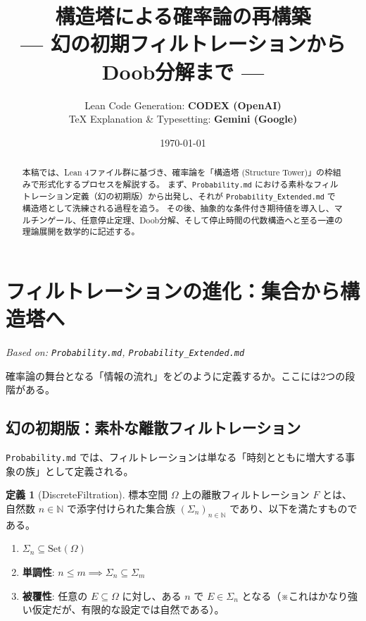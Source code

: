 \documentclass[a4paper,11pt]{ltjsarticle}
\title{\textbf{構造塔による確率論の再構築} \\ \large --- 幻の初期フィルトレーションからDoob分解まで ---}
\author{
    Lean Code Generation: \textbf{CODEX (OpenAI)} \\
    TeX Explanation \& Typesetting: \textbf{Gemini (Google)}
}
\date{\today}
\theoremstyle{definition}
\newtheorem{definition}{定義}[section]
\newcommand{\N}{\mathbb{N}}
\newcommand{\OmegaSpace}{\Omega}
\begin{document}
\maketitle

\begin{abstract}
本稿では、Lean 4ファイル群に基づき、確率論を「構造塔 (Structure Tower)」の枠組みで形式化するプロセスを解説する。
まず、\texttt{Probability.md} における素朴なフィルトレーション定義（幻の初期版）から出発し、それが \texttt{Probability\_Extended.md} で構造塔として洗練される過程を追う。
その後、抽象的な条件付き期待値を導入し、マルチンゲール、任意停止定理、Doob分解、そして停止時間の代数構造へと至る一連の理論展開を数学的に記述する。
\end{abstract}

\tableofcontents
\newpage

\section{フィルトレーションの進化：集合から構造塔へ}
\label{sec:foundations}
\textit{Based on: \texttt{Probability.md}, \texttt{Probability\_Extended.md}}

確率論の舞台となる「情報の流れ」をどのように定義するか。ここには2つの段階がある。

\subsection{幻の初期版：素朴な離散フィルトレーション}
\texttt{Probability.md} では、フィルトレーションは単なる「時刻とともに増大する事象の族」として定義される。

\begin{definition}[DiscreteFiltration]
標本空間 $\OmegaSpace$ 上の離散フィルトレーション $F$ とは、自然数 $n \in \N$ で添字付けられた集合族 $(\Sigma_n)_{n \in \N}$ であり、以下を満たすものである。
\begin{enumerate}
    \item $\Sigma_n \subseteq \text{Set}(\OmegaSpace)$
    \item \textbf{単調性}: $n \le m \implies \Sigma_n \subseteq \Sigma_m$
    \item \textbf{被覆性}: 任意の $E \subseteq \OmegaSpace$ に対し、ある $n$ で $E \in \Sigma_n$ となる（※これはかなり強い仮定だが、有限的な設定では自然である）。
\end{enumerate}
\end{definition}
\end{document}
